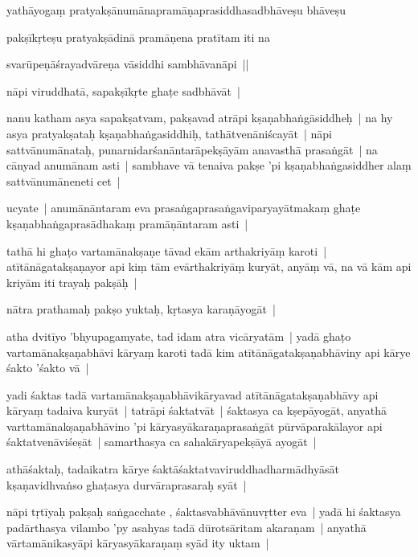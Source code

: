 \documentclass[article,a4paper]{memoir}
\begin{document}
	  \pstart yathā\-yogaṃ pratyakṣā\-numā\-napramā\-ṇaprasiddhasadbhā\-veṣu bhā\-veṣu
	\pend
      

	  \pstart pakṣī\-kṛteṣu pratyakṣā\-dinā\- pramā\-ṇena pratī\-tam iti na
	\pend
      

	  \pstart svarū\-peṇā\-śrayadvā\-reṇa vā\-siddhi sambhā\-vanā\-pi ||
	\pend
      

	  \pstart nā\-pi viruddhatā\-, sapakṣī\-kṛte ghaṭe sadbhā\-vā\-t |
	\pend
      

	  \pstart nanu katham asya sapakṣatvam, pakṣavad atrā\-pi kṣaṇabhaṅgā\-siddheḥ | na hy asya pratyakṣataḥ kṣaṇabhaṅgasiddhiḥ, tathā\-tvenā\-niścayā\-t | nā\-pi sattvā\-numā\-nataḥ, punarnidarśanā\-ntarā\-pekṣā\-yā\-m anavasthā\- prasaṅgā\-t | na cā\-nyad anumā\-nam asti | sambhave vā\- tenaiva pakṣe 'pi kṣaṇabhaṅgasiddher alaṃ sattvā\-numā\-neneti cet |
	\pend
      

	  \pstart ucyate | anumā\-nā\-ntaram eva prasaṅgaprasaṅgaviparyayā\-tmakaṃ ghaṭe kṣaṇabhaṅgaprasā\-dhakaṃ pramā\-ṇā\-ntaram asti | 
	\pend
      

	  \pstart tathā\- hi ghaṭo vartamā\-nakṣaṇe tā\-vad ekā\-m arthakriyā\-ṃ karoti | atī\-tā\-nā\-gatakṣaṇayor api kiṃ tā\-m evā\-rthakriyā\-ṃ kuryā\-t, anyā\-ṃ vā\-, na vā\- kā\-m api kriyā\-m iti trayaḥ pakṣā\-ḥ | 
	\pend
      

	  \pstart nā\-tra prathamaḥ pakṣo yuktaḥ, kṛtasya karaṇā\-yogā\-t |
	\pend
      

	  \pstart atha dvitī\-yo 'bhyupagamyate, tad idam atra vicā\-ryatā\-m | yadā\- ghaṭo vartamā\-nakṣaṇabhā\-vi kā\-ryaṃ karoti tadā\- kim atī\-tā\-nā\-gatakṣaṇabhā\-viny api kā\-rye śakto 'śakto vā\- |
	\pend
      

	  \pstart yadi śaktas tadā\- vartamā\-nakṣaṇabhā\-vikā\-ryavad atī\-tā\-nā\-gatakṣaṇabhā\-vy api kā\-ryaṃ tadaiva kuryā\-t | tatrā\-pi śaktatvā\-t | śaktasya ca kṣepā\-yogā\-t, anyathā\- varttamā\-nakṣaṇabhā\-vino 'pi kā\-ryasyā\-karaṇaprasaṅgā\-t pū\-rvā\-parakā\-layor api śaktatvenā\-viśeṣā\-t | samarthasya ca sahakā\-ryapekṣā\-yā\- ayogā\-t | 
	\pend
      

	  \pstart athā\-śaktaḥ, tadaikatra kā\-rye śaktā\-śaktatvaviruddhadharmā\-dhyā\-sā\-t kṣaṇavidhvaṅso ghaṭasya durvā\-raprasaraḥ syā\-t |
	\pend
      

	  \pstart nā\-pi tṛtī\-yaḥ pakṣaḥ saṅgacchate , śaktasvabhā\-vā\-nuvṛtter eva | yadā\- hi śaktasya padā\-rthasya vilambo 'py asahyas tadā\- dū\-rotsā\-ritam akaraṇam | anyathā\- vā\-rtamā\-nikasyā\-pi kā\-ryasyā\-karaṇaṃ syā\-d ity uktam | 
	\pend
      
\end{document}
